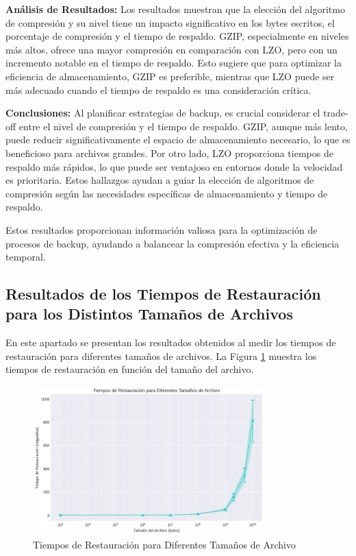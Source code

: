 \textbf{Análisis de Resultados:}
Los resultados muestran que la elección del algoritmo de compresión y su nivel tiene un impacto significativo en los bytes escritos, el porcentaje de compresión y el tiempo de respaldo. GZIP, especialmente en niveles más altos, ofrece una mayor compresión en comparación con LZO, pero con un incremento notable en el tiempo de respaldo. Esto sugiere que para optimizar la eficiencia de almacenamiento, GZIP es preferible, mientras que LZO puede ser más adecuado cuando el tiempo de respaldo es una consideración crítica.

\textbf{Conclusiones:}
Al planificar estrategias de backup, es crucial considerar el trade-off entre el nivel de compresión y el tiempo de respaldo. GZIP, aunque más lento, puede reducir significativamente el espacio de almacenamiento necesario, lo que es beneficioso para archivos grandes. Por otro lado, LZO proporciona tiempos de respaldo más rápidos, lo que puede ser ventajoso en entornos donde la velocidad es prioritaria. Estos hallazgos ayudan a guiar la elección de algoritmos de compresión según las necesidades específicas de almacenamiento y tiempo de respaldo.

Estos resultados proporcionan información valiosa para la optimización de procesos de backup, ayudando a balancear la compresión efectiva y la eficiencia temporal.



\subsection{Resultados de los Tiempos de Restauración para los Distintos Tamaños de Archivos}

En este apartado se presentan los resultados obtenidos al medir los tiempos de restauración para diferentes tamaños de archivos. La Figura \ref{fig:tiempo-restauracion} muestra los tiempos de restauración en función del tamaño del archivo.

\begin{figure}[H]
    \centering
    \includegraphics[width=0.8\textwidth]{tiempo_restauracion.png}
    \caption{Tiempos de Restauración para Diferentes Tamaños de Archivo}
    \label{fig:tiempo-restauracion}
\end{figure}

